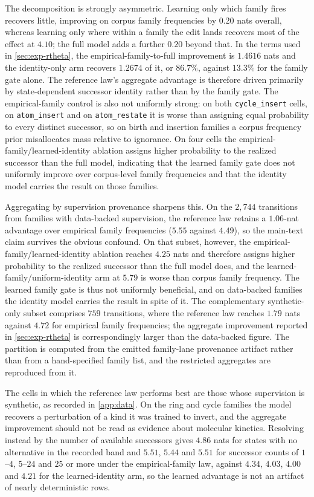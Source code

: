 \documentclass{article}
\theoremstyle{definition}
\theoremstyle{remark}
\newcommand{\op}[1]{\texttt{#1}}
\begin{document}
The decomposition is strongly asymmetric. Learning only which family fires recovers little, improving on corpus family frequencies by $0.20$ nats overall, whereas learning only where within a family the edit lands recovers most of the effect at $4.10$; the full model adds a further $0.20$ beyond that. In the terms used in \cref{sec:exp-rtheta}, the empirical-family-to-full improvement is $1.4616$ nats and the identity-only arm recovers $1.2674$ of it, or $86.7\%$, against $13.3\%$ for the family gate alone. The reference law's aggregate advantage is therefore driven primarily by state-dependent successor identity rather than by the family gate. The empirical-family control is also not uniformly strong: on both \texttt{cycle\_insert} cells, on \op{atom\_insert} and on \op{atom\_restate} it is worse than assigning equal probability to every distinct successor, so on birth and insertion families a corpus frequency prior misallocates mass relative to ignorance. On four cells the empirical-family/learned-identity ablation assigns higher probability to the realized successor than the full model, indicating that the learned family gate does not uniformly improve over corpus-level family frequencies and that the identity model carries the result on those families.

Aggregating by supervision provenance sharpens this. On the $2{,}744$ transitions from families with data-backed supervision, the reference law retains a $1.06$-nat advantage over empirical family frequencies ($5.55$ against $4.49$), so the main-text claim survives the obvious confound. On that subset, however, the empirical-family/learned-identity ablation reaches $4.25$ nats and therefore assigns higher probability to the realized successor than the full model does, and the learned-family/uniform-identity arm at $5.79$ is worse than corpus family frequency. The learned family gate is thus not uniformly beneficial, and on data-backed families the identity model carries the result in spite of it. The complementary synthetic-only subset comprises $759$ transitions, where the reference law reaches $1.79$ nats against $4.72$ for empirical family frequencies; the aggregate improvement reported in \cref{sec:exp-rtheta} is correspondingly larger than the data-backed figure. The partition is computed from the emitted family-lane provenance artifact rather than from a hand-specified family list, and the restricted aggregates are reproduced from it.

The cells in which the reference law performs best are those whose supervision is synthetic, as recorded in \cref{app:data}. On the ring and cycle families the model recovers a perturbation of a kind it was trained to invert, and the aggregate improvement should not be read as evidence about molecular kinetics. Resolving instead by the number of available successors gives $4.86$ nats for states with no alternative in the recorded band and $5.51$, $5.44$ and $5.51$ for successor counts of $1$--$4$, $5$--$24$ and $25$ or more under the empirical-family law, against $4.34$, $4.03$, $4.00$ and $4.21$ for the learned-identity arm, so the learned advantage is not an artifact of nearly deterministic rows.
\end{document}
